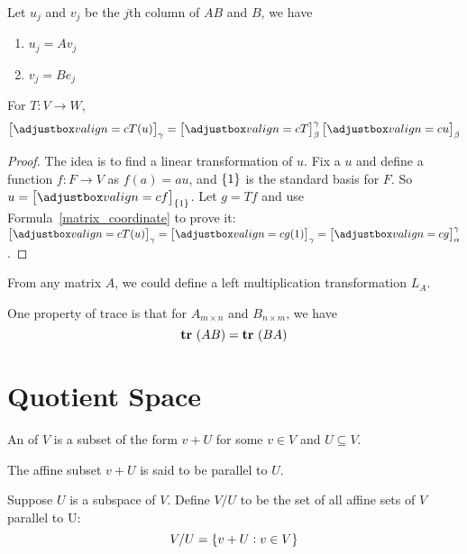 Let $u_j$ and $v_j$ be the $j$th column of $AB$ and $B$, we have
\begin{enumerate}
    \item $u_j = A v_j$
    \item $v_j = B e_j$
\end{enumerate}

\begin{theorem}
    For $T: V \rightarrow W$,
    \begin{equation}
        \coordinate{T(u)}_\gamma = \coordinate{T}_{\beta}^{\gamma} \coordinate{u}_{\beta}
    \end{equation}    
\end{theorem}
\begin{proof}
    The idea is to find a linear transformation of $u$. Fix a $u$ and define a function $f: F \rightarrow V$ as $f(a) = au$, and $\set{1}$ is the standard basis for $F$. So $u = \coordinate{f}_{\set{1}}$. Let $g=Tf$ and use Formula~\ref{matrix_coordinate} to prove it: $\coordinate{T(u)}_\gamma = \coordinate{g(1)}_\gamma = \coordinate{g}_{\alpha}^{\gamma}$.
\end{proof}

From any matrix $A$, we could define a left multiplication transformation $L_A$.

One property of trace is that for $A_{m \times n}$ and $B_{n \times m}$, we have
\begin{equation}
    \displaystyle \mathop{\bf tr\/}~( AB ) = \displaystyle \mathop{\bf tr\/}~( BA )
\end{equation}



%
%
%
%
\section{Quotient Space}

\begin{definition}
    An  of $V$ is a subset of the form $v + U$ for some $v\in V$ and $U \subseteq V$.
    
    The affine subset $v+U$ is said to be parallel to $U$.
\end{definition}

\begin{definition}
    Suppose $U$ is a subspace of $V$. Define  $V/U$ to be the set of all affine sets of $V$ parallel to U:
    \begin{equation}
        V/U = \set{v + U: v \in V}
    \end{equation}
\end{definition}

